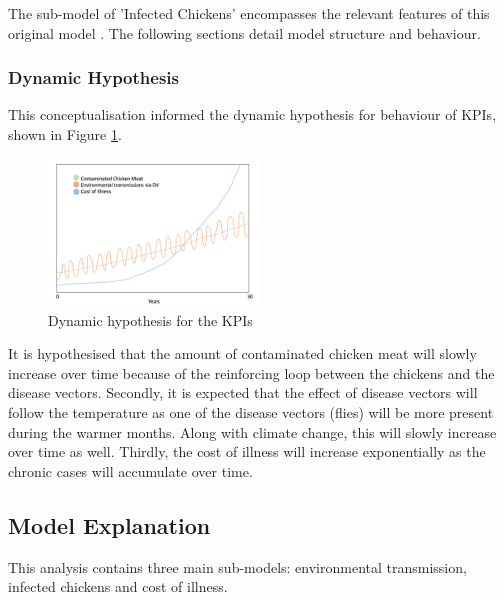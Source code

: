 The sub-model of 'Infected Chickens' encompasses the relevant features of this original model \parencite{rommens_infected_2020}. The following sections detail model structure and behaviour. 

\subsubsection*{Dynamic Hypothesis}

This conceptualisation informed the dynamic hypothesis for behaviour of KPIs, shown in Figure \ref{fig:dynamic_hypothesis}. 

\begin{figure}[h]
\centering
\includegraphics[width=0.50\textwidth]{images/KPI_dynamic_hypo.png}
\caption{Dynamic hypothesis for the KPIs}
\label{fig:dynamic_hypothesis}
\end{figure}

It is hypothesised that the amount of contaminated chicken meat will slowly increase over time because of the reinforcing loop between the chickens and the disease vectors. 
Secondly, it is expected that the effect of disease vectors will follow the temperature as one of the disease vectors (flies) will be more present during the warmer months. Along with climate change, this will slowly increase over time as well. 
Thirdly, the cost of illness will increase exponentially as the chronic cases will accumulate over time. 


\subsection{Model Explanation}
   
This analysis contains three main sub-models: environmental transmission, infected chickens and cost of illness. 

